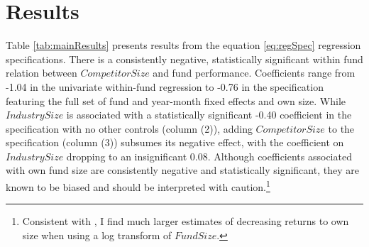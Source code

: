 \documentclass[openany]{book}
\let\rmarkdownfootnote\footnote%
\def\footnote{\protect\rmarkdownfootnote}
\theoremstyle{definition}
\theoremstyle{definition}
\theoremstyle{definition}
\theoremstyle{remark}
\begin{document}
\section{Results}\label{results-1}

Table \ref{tab:mainResults} presents results from the equation
\eqref{eq:regSpec} regression specifications. There is a consistently
negative, statistically significant within fund relation between
\(CompetitorSize\) and fund performance. Coefficients range from -1.04
in the univariate within-fund regression to -0.76 in the specification
featuring the full set of fund and year-month fixed effects and own
size. While \(IndustrySize\) is associated with a statistically
significant -0.40 coefficient in the specification with no other
controls (column (2)), adding \(CompetitorSize\) to the specification
(column (3)) subsumes its negative effect, with the coefficient on
\(IndustrySize\) dropping to an insignificant 0.08. Although
coefficients associated with own fund size are consistently negative and
statistically significant, they are known to be biased and should be
interpreted with caution.\footnote{Consistent with \citet{hl17}, I find
  much larger estimates of decreasing returns to own size when using a
  log transform of \(FundSize\).}
\end{document}
